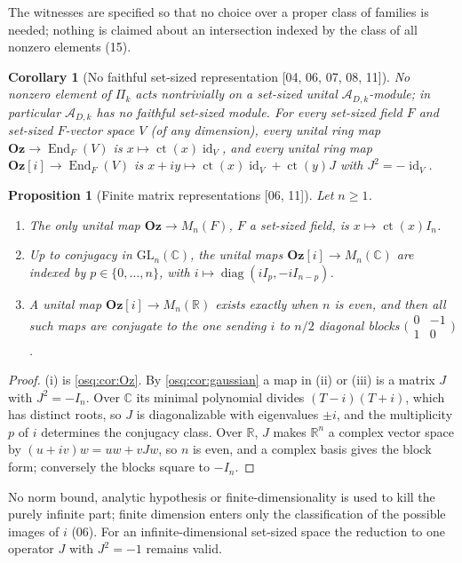 \documentclass[11pt,letterpaper]{article}
\numberwithin{equation}{section}
\newtheorem{proposition}[proposition]{Proposition}
\newtheorem{corollary}[corollary]{Corollary}
\theoremstyle{definition}
\theoremstyle{remark}
\theoremstyle{plain}
\newcommand{\Oz}{\mathbf{Oz}}
\newcommand{\GOz}{\Oz[i]}
\newcommand{\R}{\mathbb R}
\newcommand{\C}{\mathbb C}
\newcommand{\A}{\mathcal A}          %
\newcommand{\ct}{\operatorname{ct}}
\newcommand{\End}{\operatorname{End}}
\newcommand{\id}{\operatorname{id}}
\DeclareMathOperator{\diag}{diag}
\newcommand{\src}[1]{\textup{\textsf{[#1]}}}
\begin{document}
The witnesses are specified so that no choice over a proper class of families is needed; nothing is claimed about an
intersection indexed by the class of all nonzero elements (15).

\begin{corollary}[No faithful set-sized representation \src{04, 06, 07, 08, 11}]\label{osq:cor:faithful}
No nonzero element of $\Pi_k$ acts nontrivially on a set-sized unital $\A_{D,k}$-module; in
particular $\A_{D,k}$ has no faithful set-sized module. For every set-sized field $F$ and
set-sized $F$-vector space $V$ (of any dimension), every unital ring map
$\Oz\to\End_F(V)$ is $x\mapsto\ct(x)\id_V$, and every unital ring map $\GOz\to\End_F(V)$
is $x+iy\mapsto\ct(x)\id_V+\ct(y)J$ with $J^2=-\id_V$.
\end{corollary}

\begin{proposition}[Finite matrix representations \src{06, 11}]\label{osq:prop:matrices}
Let $n\ge1$.
\begin{enumerate}
\item The only unital map $\Oz\to M_n(F)$, $F$ a set-sized field, is $x\mapsto\ct(x)I_n$.
\item Up to conjugacy in $\mathrm{GL}_n(\C)$, the unital maps $\GOz\to M_n(\C)$ are
indexed by $p\in\{0,\dots,n\}$, with $i\mapsto\diag(iI_p,-iI_{n-p})$.
\item A unital map $\GOz\to M_n(\R)$ exists exactly when $n$ is even, and then all such
maps are conjugate to the one sending $i$ to $n/2$ diagonal blocks
$\bigl(\begin{smallmatrix}0&-1\\1&0\end{smallmatrix}\bigr)$.
\end{enumerate}
\end{proposition}
\begin{proof}
(i) is \cref{osq:cor:Oz}. By \cref{osq:cor:gaussian} a map in (ii) or (iii) is a matrix
$J$ with $J^2=-I_n$. Over $\C$ its minimal polynomial divides $(T-i)(T+i)$, which has
distinct roots, so $J$ is diagonalizable with eigenvalues $\pm i$, and the multiplicity
$p$ of $i$ determines the conjugacy class. Over $\R$, $J$ makes $\R^n$ a complex vector
space by $(u+iv)w=uw+vJw$, so $n$ is even, and a complex basis gives the block form;
conversely the blocks square to $-I_n$.
\end{proof}

No norm bound, analytic hypothesis or finite-dimensionality is used to kill the purely
infinite part; finite dimension enters only the classification of the possible images of
$i$ (06). For an infinite-dimensional set-sized space the reduction to one operator $J$ with
$J^2=-1$ remains valid.
\end{document}
